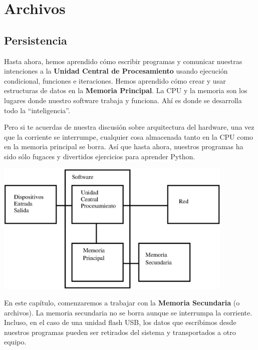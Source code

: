 
\chapter{Archivos}



\section{Persistencia}


Hasta ahora, hemos aprendido cómo escribir programas y comunicar
nuestras intenciones a la {\bf Unidad Central de Procesamiento} usando ejecución
condicional, funciones e iteraciones. Hemos aprendido cómo
crear y usar estructuras de datos en la {\bf Memoria Principal}. La CPU
y la memoria son los lugares donde nuestro software trabaja y funciona. Ahí es
donde se desarrolla todo la ``inteligencia''.

Pero si te acuerdas de nuestra discusión sobre arquitectura del hardware,
una vez que la corriente se interrumpe, cualquier cosa almacenada tanto
en la CPU como en la memoria principal se borra. Así que hasta ahora, nuestros
programas ha sido sólo fugaces y divertidos ejercicios para aprender Python.

\beforefig
\centerline{\includegraphics[height=2.50in]{figs2/arch3.eps}}
\afterfig

En este capítulo, comenzaremos a trabajar con la {\bf Memoria Secundaria}
(o archivos).
La memoria secundaria no se borra aunque se interrumpa la corriente.
Incluso, en el caso de una unidad flash USB, los
datos que escribimos desde nuestros programas pueden ser retirados
del sistema y transportados a otro equipo.

